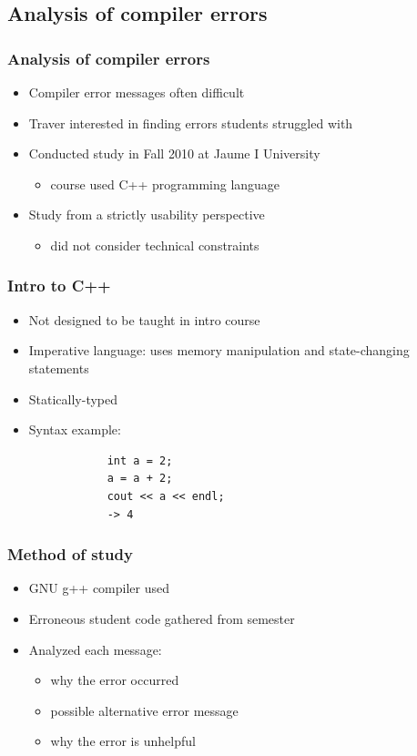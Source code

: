 \documentclass{beamer}
\begin{document}
\subsection[Compiler Analysis]{Analysis of compiler errors}

\begin{frame}
	\frametitle{Analysis of compiler errors}
		\begin{itemize}
			\item Compiler error messages often difficult
			\item Traver interested in finding errors students struggled with
			\item Conducted study in Fall 2010 at Jaume I University
				\begin{itemize}
				\item course used C++ programming language
				\end{itemize}
			\item Study from a strictly usability perspective
			\begin{itemize}
				\item did not consider technical constraints
			\end{itemize}
		\end{itemize}

\end{frame}

\begin{frame}[fragile]
	\frametitle{Intro to C++}
		\begin{itemize}
			\item Not designed to be taught in intro course
			\item Imperative language: uses memory manipulation and state-changing statements
			\item Statically-typed
			\item Syntax example:
			\begin{verbatim}
			int a = 2;
			a = a + 2;
			cout << a << endl;
			-> 4
			\end{verbatim}
		\end{itemize}

\end{frame}

\begin{frame}
	\frametitle{Method of study}
		\begin{itemize}
			\item GNU g++ compiler used
			\item Erroneous student code gathered from semester
			\item Analyzed each message:
			\begin{itemize}
				\item why the error occurred
				\item possible alternative error message
				\item why the error is unhelpful
			\end{itemize}
		\end{itemize}

\end{frame}
\end{document}

